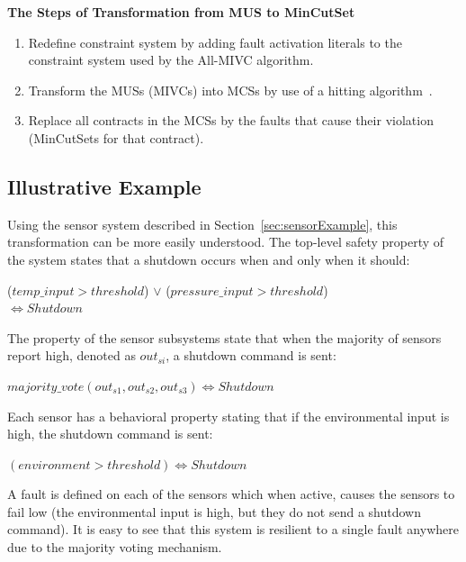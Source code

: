 \textbf{The Steps of Transformation from MUS to MinCutSet}
\begin{enumerate}
\item Redefine constraint system by adding fault activation literals to the constraint system used by the All-MIVC algorithm. %
\item Transform the MUSs (MIVCs) into MCSs by use of a hitting algorithm~\cite{murakami2013efficient,gainer2017minimal}. 
\item Replace all contracts in the MCSs by the faults that cause their violation (MinCutSets for that contract). 
\end{enumerate}

\subsection{Illustrative Example}
Using the sensor system described in Section~\ref{sec:sensorExample}, this transformation can be more easily understood. The top-level safety property of the system states that a shutdown occurs when and only when it should: 
\begin{center}
    ($temp\_input > threshold$) $\lor$ ($pressure\_input > threshold$)\\
    $\iff Shutdown$
    
\end{center}

The property of the sensor subsystems state that when the majority of sensors report high, denoted as $out_{si}$, a shutdown command is sent:
\begin{center}
    $majority\_vote(out_{s1}, out_{s2}, out_{s3}) \iff Shutdown$
    
\end{center}

Each sensor has a behavioral property stating that if the environmental input is high, the shutdown command is sent: 
\begin{center}
    $(environment > threshold) \iff Shutdown$
    
\end{center}

A fault is defined on each of the sensors which when active, causes the sensors to fail low (the environmental input is high, but they do not send a shutdown command). It is easy to see that this system is resilient to a single fault anywhere due to the majority voting mechanism. \\


